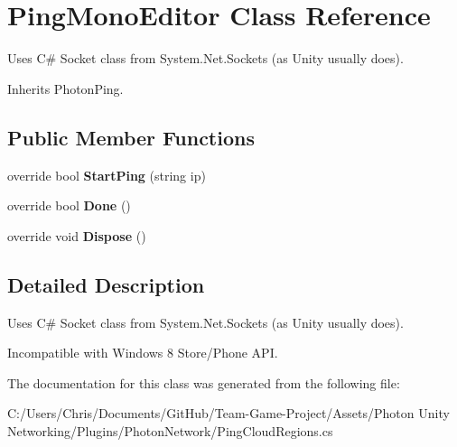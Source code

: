 \hypertarget{class_ping_mono_editor}{}\section{Ping\+Mono\+Editor Class Reference}
\label{class_ping_mono_editor}


Uses C\# Socket class from System.\+Net.\+Sockets (as Unity usually does).  




Inherits Photon\+Ping.

\subsection*{Public Member Functions}
\begin{DoxyCompactItemize}
\item 
override bool {\bfseries Start\+Ping} (string ip)\hypertarget{class_ping_mono_editor_a2e854f702a4ced545a5b4405a511941e}{}\label{class_ping_mono_editor_a2e854f702a4ced545a5b4405a511941e}

\item 
override bool {\bfseries Done} ()\hypertarget{class_ping_mono_editor_a4bcf82f6d83763d40da8a8b91a602245}{}\label{class_ping_mono_editor_a4bcf82f6d83763d40da8a8b91a602245}

\item 
override void {\bfseries Dispose} ()\hypertarget{class_ping_mono_editor_ae09a896c196c491b286e42b4bae1b5ff}{}\label{class_ping_mono_editor_ae09a896c196c491b286e42b4bae1b5ff}

\end{DoxyCompactItemize}


\subsection{Detailed Description}
Uses C\# Socket class from System.\+Net.\+Sockets (as Unity usually does). 

Incompatible with Windows 8 Store/\+Phone A\+PI.

The documentation for this class was generated from the following file\+:\begin{DoxyCompactItemize}
\item 
C\+:/\+Users/\+Chris/\+Documents/\+Git\+Hub/\+Team-\/\+Game-\/\+Project/\+Assets/\+Photon Unity Networking/\+Plugins/\+Photon\+Network/Ping\+Cloud\+Regions.\+cs\end{DoxyCompactItemize}
